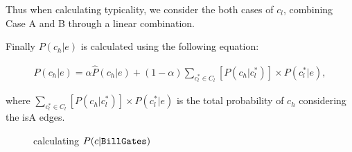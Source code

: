 %
Thus when calculating typicality, we consider the both cases of $c_l$, combining Case A and B through a linear combination.

Finally  $P({c_h}|e)$ is calculated using the following equation:

\begin{equation}
\begin{split}
P({c_h}|e) = \alpha \hat{P}({c_h}|e)+ (1-\alpha) \sum_{ c_{l}^*\in C_{l} } [P({c_h}|c_{l}^*) ] \times  P(c_{l}^*|e),
\end{split}
\label{eq:pgge}\end{equation}

where $\sum_{ c_{l}^*\in C_{l} } [P({c_h}|c_{l}^*) ] \times  P(c_{l}^*|e)$ is the total probability of $c_h$ considering the isA edges.


\begin{figure}[!hptb]
\label{fig:pgge}
\centering
{}%
\caption{calculating $P({c}|{\tt Bill Gates})$ }
\end{figure}


